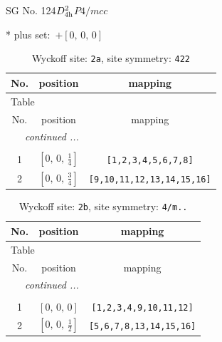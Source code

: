 \documentclass[fleqn,8pt]{jsarticle}
\begin{document}
\setcounter{MaxMatrixCols}{32}

\renewcommand{\tablename}{Table~}
\renewcommand{\figurename}{Figure~}
\begin{center}
\LARGE
SG No. 124\quad$D_{\rm 4h}^{2}$\quad$P4/mcc$\quad[ tetragonal ]
\end{center}
* plus set:\,\,\,$+\left[ 0,\, 0,\, 0 \right]$
\renewcommand{\arraystretch}{1.2}
\begin{longtable}{ccc}
\caption{Wyckoff site: {\tt 2a}, site symmetry: {\tt 422}}
 \\
 \hline \hline
No. & position & mapping \\ \hline \endfirsthead

\multicolumn{2}{l}{\tablename\ \thetable{}} \\
 \hline \hline
No. & position & mapping \\ \hline \endhead

 \hline \hline
\multicolumn{2}{r}{\footnotesize\it continued ...} \\ \endfoot

 \hline \hline
\multicolumn{2}{r}{} \\ \endlastfoot

1 & $\left[ 0,\, 0,\, \frac{1}{4} \right]$ & {\tt [1,2,3,4,5,6,7,8]} \\ \hline
2 & $\left[ 0,\, 0,\, \frac{3}{4} \right]$ & {\tt [9,10,11,12,13,14,15,16]} \\
\end{longtable}
\renewcommand{\arraystretch}{1.2}
\begin{longtable}{ccc}
\caption{Wyckoff site: {\tt 2b}, site symmetry: {\tt 4/m..}}
 \\
 \hline \hline
No. & position & mapping \\ \hline \endfirsthead

\multicolumn{2}{l}{\tablename\ \thetable{}} \\
 \hline \hline
No. & position & mapping \\ \hline \endhead

 \hline \hline
\multicolumn{2}{r}{\footnotesize\it continued ...} \\ \endfoot

 \hline \hline
\multicolumn{2}{r}{} \\ \endlastfoot

1 & $\left[ 0,\, 0,\, 0 \right]$ & {\tt [1,2,3,4,9,10,11,12]} \\ \hline
2 & $\left[ 0,\, 0,\, \frac{1}{2} \right]$ & {\tt [5,6,7,8,13,14,15,16]} \\
\end{longtable}
\end{document}
